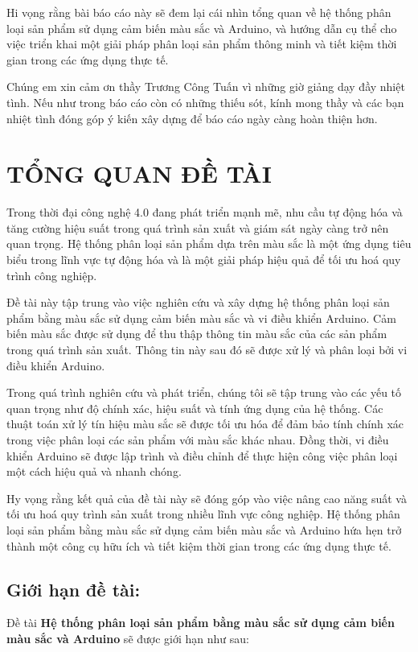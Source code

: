 \documentclass[12pt]{report}
\begin{document}
Hi vọng rằng bài báo cáo này sẽ đem lại cái nhìn tổng quan về hệ thống phân loại sản phẩm sử dụng cảm biến màu sắc và Arduino, và hướng dẫn cụ thể cho việc triển khai một giải pháp phân loại sản phẩm thông minh và tiết kiệm thời gian trong các ứng dụng thực tế.


Chúng em xin cảm ơn thầy Trương Công Tuấn vì những giờ giảng dạy đầy nhiệt tình.  Nếu như trong báo cáo còn có những thiếu sót, kính mong thầy và các bạn nhiệt tình đóng góp ý kiến xây dựng để báo cáo ngày càng hoàn thiện hơn.
\chapter{TỔNG QUAN ĐỀ TÀI}

Trong thời đại công nghệ 4.0 đang phát triển mạnh mẽ, nhu cầu tự động hóa và tăng cường hiệu suất trong quá trình sản xuất và giám sát ngày càng trở nên quan trọng. Hệ thống phân loại sản phẩm dựa trên màu sắc là một ứng dụng tiêu biểu trong lĩnh vực tự động hóa và là một giải pháp hiệu quả để tối ưu hoá quy trình công nghiệp.

Đề tài này tập trung vào việc nghiên cứu và xây dựng hệ thống phân loại sản phẩm bằng màu sắc sử dụng cảm biến màu sắc và vi điều khiển Arduino. Cảm biến màu sắc được sử dụng để thu thập thông tin màu sắc của các sản phẩm trong quá trình sản xuất. Thông tin này sau đó sẽ được xử lý và phân loại bởi vi điều khiển Arduino.

Trong quá trình nghiên cứu và phát triển, chúng tôi sẽ tập trung vào các yếu tố quan trọng như độ chính xác, hiệu suất và tính ứng dụng của hệ thống. Các thuật toán xử lý tín hiệu màu sắc sẽ được tối ưu hóa để đảm bảo tính chính xác trong việc phân loại các sản phẩm với màu sắc khác nhau. Đồng thời, vi điều khiển Arduino sẽ được lập trình và điều chỉnh để thực hiện công việc phân loại một cách hiệu quả và nhanh chóng.

Hy vọng rằng kết quả của đề tài này sẽ đóng góp vào việc nâng cao năng suất và tối ưu hoá quy trình sản xuất trong nhiều lĩnh vực công nghiệp. Hệ thống phân loại sản phẩm bằng màu sắc sử dụng cảm biến màu sắc và Arduino hứa hẹn trở thành một công cụ hữu ích và tiết kiệm thời gian trong các ứng dụng thực tế.

\section{Giới hạn đề tài:}
Đề tài \textbf{Hệ thống phân loại sản phẩm bằng màu sắc sử dụng cảm biến màu sắc và Arduino} sẽ được giới hạn như sau:
\end{document}
